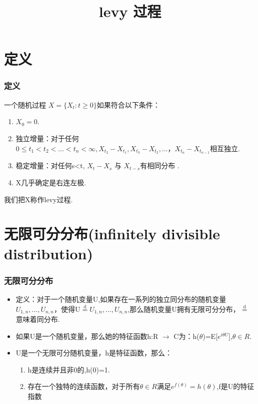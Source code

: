 \documentclass[10pt,aspectratio=169,mathserif]{beamer}
\title{levy 过程}
\begin{document}
\begin{frame}
\titlepage
\end{frame}				%

\begin{frame}
\tableofcontents
\end{frame}				%

\section{定义}
\begin{frame}
  \frametitle{定义}
  一个随机过程 ${X=\{X_{t}:t\geq 0\}}$如果符合以下条件： 
  \begin{enumerate}[(1)]
    \item $X_{0}=0$.
    \item 独立增量：对于任何$0\leq t_{1} < t_{2} < \dots < t_{n} < \infty ,X_{t_2}-X_{t_1},X_{t_3}-X_{t_2},\dots，X_{t_n}-X_{t_{n-1}}$相互独立.
    \item 稳定增量：对任何s<t, $X_{t}-X_{s}$ 与 $X_{t-s}$有相同分布 .  
     \item X几乎确定是右连左极.
     \end{enumerate}
     我们把X称作levy过程.
\end{frame}

\section{无限可分分布(infinitely divisible distribution)}
\begin{frame}
  \frametitle{无限可分分布}
  \begin{itemize}
  \item 定义：对于一个随机变量U,如果存在一系列的独立同分布的随机变量$U_{1,n},\dots,U_{n,n}$，使得U$\overset{\text{d}}{=}U_{1,n},\dots,U_{n,n}$,那么随机变量U拥有无限可分分布，$\overset{\text{d}}{=}$意味着同分布.
  \item 如果U是一个随机变量，那么她的特征函数h:R $\to$ C为：h($\theta$)=E[$e^{i\theta U}$],$\theta \in R$.
  \item U是一个无限可分随机变量，h是特征函数，那么：
  	\begin{enumerate}[(1)]
	\item h是连续并且非0的,h(0)=1.
	\item 存在一个独特的连续函数，对于所有$\theta \in R$满足$e^{f(\theta)}=h(\theta)$,f是U的特征指数
	\end{enumerate}
  \end{itemize}
\end{frame}
\end{document}
